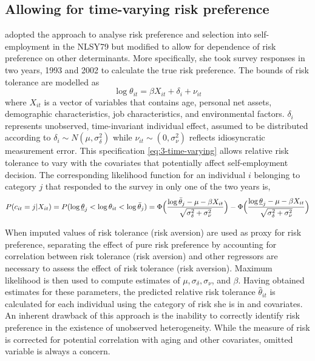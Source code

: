 \documentclass[]{article}
\begin{document}
\subsection{Allowing for time-varying risk preference}	
\citet{ahn2010attitudes} adopted the approach to analyse risk preference and selection into self-employment in the NLSY79 but modified to allow for dependence of risk preference on other determinants. More specifically, she took survey responses in two years, 1993 and 2002 to calculate the true risk preference. The bounds of risk tolerance are modelled as
 	\begin{equation}
 		\log \theta_{it}=\beta X_{it} + \delta_i+\nu_{it}
 		\label{eq:3-time-varying}
 	\end{equation}
where $X_{it}$ is a vector of variables that contains age, personal net assets, demographic characteristics, job characteristics, and environmental factors. $\delta_i$ represents unobserved, time-invariant individual effect, assumed to be distributed according to $\delta_i\sim N(\mu, \sigma^2_\delta)$ while $\nu_{it}\sim (0,\sigma^2_\nu)$ reflects idiosyncratic measurement error. This specification \eqref{eq:3-time-varying} allows relative risk tolerance to vary with the covariates that potentially affect self-employment decision. The corresponding likelihood function for an individual $i$ belonging to category $j$ that responded to the survey in only one of the two years is,
\begin{equation}
	P(c_{it}=j|X_{it})=P(\log\underline{\theta}_j<\log\theta_{it}<\log\bar\theta_j)=\Phi\Big( { \log\bar\theta_j-\mu-\beta X_{it}\over \sqrt{\sigma^2_\delta+\sigma^2_\nu} } \Big)-\Phi\Big( { \log\underline{\theta}_j-\mu-\beta X_{it}\over \sqrt{\sigma^2_\delta+\sigma^2_\nu} } \Big)
	\label{eq:4-likelihood-varying}
\end{equation} 

When imputed values of risk tolerance (risk aversion) are used as proxy for risk preference, separating the effect of pure risk preference by accounting for correlation between risk tolerance (risk aversion) and other regressors are necessary to assess the effect of risk tolerance (risk aversion). Maximum likelihood is then used to compute estimates of $\mu, \sigma_\delta, \sigma_\nu$, and $\beta$. Having obtained estimates for these parameters, the predicted relative risk tolerance $\hat\theta_{it}$ is calculated for each individual using the category of risk she is in and covariates. An inherent drawback of this approach is the inability to correctly identify risk preference in the existence of unobserved heterogeneity. While the measure of risk is corrected for potential correlation with aging and other covariates, omitted variable is always a concern. 
	
\end{document}
